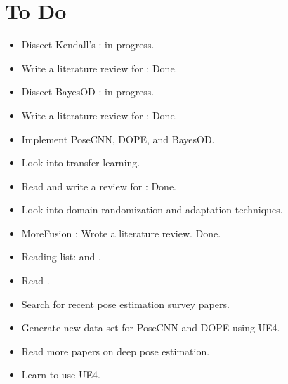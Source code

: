 \documentclass[11pt]{article}
\begin{document}
\section{To Do}
\begin{itemize}
    \item Dissect Kendall's \cite{kendall2017uncertainties}: in progress. 
    \item Write a literature review for \cite{kendall2017uncertainties}: Done.
    \item Dissect BayesOD \cite{harakeh2020bayesod}: in progress.
    \item Write a literature review for \cite{harakeh2020bayesod}: Done.
    \item Implement PoseCNN, DOPE, and BayesOD.
	\item Look into transfer learning. 
	\item Read and write a review for \cite{tobin2017domain}: Done. 
	\item Look into domain randomization and adaptation techniques.
	\item MoreFusion \cite{MoreFusion}: Wrote a literature review. Done.
	\item Reading list: \cite{lampinen2001bayesian} and \cite{li2019survey}.
    \item Read \cite{choi2013rgb}.
    \item Search for recent pose estimation survey papers.
    \item Generate new data set for PoseCNN and DOPE using UE4. 
	\item Read more papers on deep pose estimation. \item Learn to use UE4. 

\end{itemize}
\end{document}
